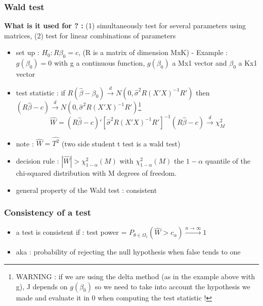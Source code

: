 \documentclass{article}
\begin{document}
\subsubsection{Wald test}
\begin{Waldbox}
    \textbf{What is it used for ? :} (1) simultaneously test for several parameters using matrices, (2) test for linear combinations of parameters
    \begin{itemize}
        \item set up : $H_0:R\beta_0 =c$, (R is a matrix of dimension MxK)
            \subitem - Example : $g(\beta_0)=0$ with g a continuous function, $g(\beta_0)$ a Mx1 vector and $\beta_0$ a Kx1 vector
        \item test statistic : if $R(\hat{\beta}-\beta_0)\xrightarrow[]{d}N(0,\hat{\sigma}^2R(X'X)^{-1}R')$ then $(R\hat{\beta}-c)\xrightarrow[]{d}N(0,\hat{\sigma}^2R(X'X)^{-1}R')$\footnote{WARNING : if we are using the delta method (as in the example above with g), J depends on $g(\beta_0)$ so we need to take into account the hypothesis we made and evaluate it in 0 when computing the test statistic ! }
        \begin{equation}
        \hat{W}=(R\hat{\beta}-c)'[\hat{\sigma}^2R(X'X)^{-1}R']^{-1}(R\hat{\beta}-c) \xrightarrow[]{d}\chi^2_M 
        \end{equation}
        \item note :  $\hat{W}=\hat{T^2}$ (two side student t test is a wald test)
        \item decision rule : $|\hat{W}|>\chi^2_{1-\alpha}(M)$ with $ \chi^2_{1-\alpha}(M)$ the $1-\alpha$ quantile of the chi-squared distribution with M degrees of freedom.
        \item general property of the Wald test : consistent
    \end{itemize}
\end{Waldbox}

\subsubsection{Consistency of a test}
\begin{itemize}
    \item a test is consistent if : test power = $P_{\theta\in\Omega_1}(\hat{W}>c_{\alpha}) \xrightarrow{n\to\infty}1$
    \item aka : probability of rejecting the null hypothesis when false tends to one
\end{itemize}
\end{document}
